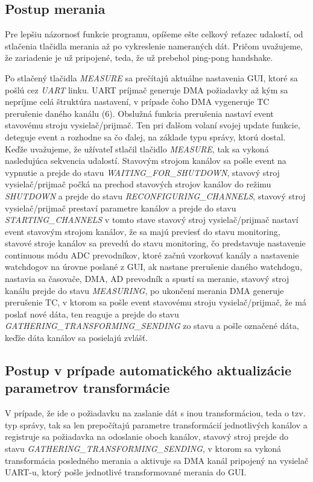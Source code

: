 \documentclass[main.tex]{subfiles}
\begin{document}
\begin{multicols*}{2}
			\subsection{Postup merania}
			Pre lepšiu názornosť funkcie programu, opíšeme ešte celkový reťazec udalostí, od stlačenia tlačidla merania až po vykreslenie nameraných dát. Pričom uvažujeme, že zariadenie je už pripojené, teda, že už prebehol ping-pong handshake.
			
			Po stlačený tlačidla \textit{MEASURE} sa prečítajú aktuálne nastavenia GUI, ktoré sa pošlú cez \textit{UART} linku. UART príjmač generuje DMA požiadavky až kým sa nepríjme celá štruktúra nastavení, v prípade čoho DMA vygeneruje TC prerušenie daného kanálu (6).  Obslužná funkcia prerušenia nastaví event stavovému stroju vysielač/prijmač. Ten pri ďalšom volaní svojej update funkcie, deteguje event a rozhodne sa čo ďalej, na základe typu správy, ktorú dostal. Keďže uvažujeme, že užívateľ stlačil tlačidlo \textit{MEASURE}, tak sa vykoná nasledujúca sekvencia udalostí. Stavovým strojom kanálov sa pošle event na vypnutie a prejde do stavu \textit{WAITING\_FOR\_SHUTDOWN}, stavový stroj vysielač/prijmač počká na prechod stavových strojov kanálov do režimu \textit{SHUTDOWN} a prejde do stavu \textit{RECONFIGURING\_CHANNELS}, stavový stroj vysielač/prijmač prestaví parametre kanálov a prejde do stavu \textit{STARTING\_CHANNELS} v tomto stave stavový stroj vysielač/prijmač nastaví event stavovým strojom kanálov, že sa majú previesť do stavu monitoring, stavové stroje kanálov sa prevedú do stavu monitoring, čo predstavuje nastavenie continuous módu ADC prevodníkov, ktoré začnú vzorkovať kanály a nastavenie watchdogov na úrovne poslané z GUI, ak nastane prerušenie daného watchdogu, nastavia sa časovače, DMA, AD prevodník a spustí sa meranie, stavový stroj kanálu prejde do stavu \textit{MEASURING}, po ukončení merania DMA generuje prerušenie TC, v ktorom sa pošle event stavovému stroju vysielač/prijmač, že má poslať nové dáta, ten reaguje a prejde do stavu \textit{GATHERING\_TRANSFORMING\_SENDING} zo stavu  a pošle označené dáta, keďže dáta kanálov sa posielajú zvlášť.
			
			\subsection{Postup v prípade automatického aktualizácie parametrov transformácie}
			 V prípade, že ide o požiadavku na zaslanie dát s inou transformáciou, teda o tzv.  typ správy, tak sa len prepočítajú parametre transformácií jednotlivých kanálov a registruje sa požiadavka na odoslanie oboch kanálov, stavový stroj prejde do stavu \textit{GATHERING\_TRANSFORMING\_SENDING}, v ktorom sa vykoná transformácia posledného merania a aktivuje sa DMA kanál pripojený na vysielač UART-u, ktorý pošle jednotlivé transformované merania do GUI.
			 
			 
		\end{multicols*}
\end{document}
